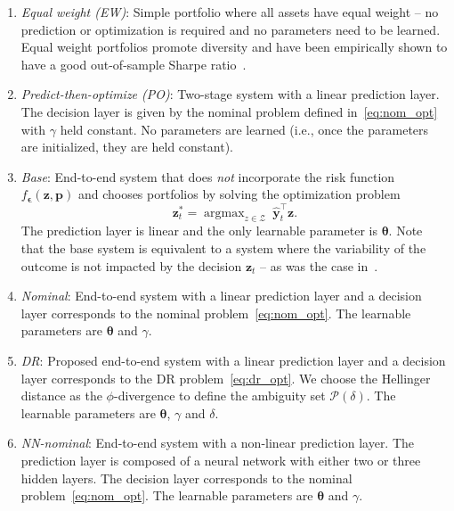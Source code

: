\documentclass[10pt, twocolumn]{article}
\theoremstyle{plain}
\theoremstyle{definition}
\DeclareMathOperator*{\argmax}{argmax}
\begin{document}
\begin{enumerate}[itemsep=-0.15em, topsep=0pt, leftmargin=*]
  
\item \emph{Equal weight (EW)}: Simple portfolio where all assets
  have equal weight -- no prediction or optimization is required
  and no parameters need to be learned. Equal weight portfolios 
  promote diversity and have been empirically shown to have a good 
  out-of-sample Sharpe ratio~\citep{demiguel2009optimal}.  
  
\item \emph{Predict-then-optimize (PO)}: Two-stage system with a linear
  prediction layer. The decision layer is given by the nominal problem defined 
  in~\eqref{eq:nom_opt} with \(\gamma\) held constant. No parameters are 
  learned (i.e., once the parameters are initialized, they are held constant).  
  
\item \emph{Base}: End-to-end system that does \emph{not} incorporate the
  risk function \(f_{\bm{\epsilon}}(\bm{z},\bm{p})\) and chooses
  portfolios by solving the optimization problem
  \[
    \bm{z}_{t}^* = \argmax_{z\in\mathcal{Z}}\ \hat{\bm{y}}_{t}^\top \bm{z}. 
  \]
  The prediction layer is linear and the only learnable parameter is
  \(\bm{\theta}\). Note that the base system is equivalent to a system where 
  the variability of the outcome is not impacted by the decision \(\bm{z}_t\) 
  -- as was the case in~\citet{donti2017task}.
  
\item \emph{Nominal}: End-to-end system with a linear prediction layer and
  a decision layer corresponds to the nominal problem~\eqref{eq:nom_opt}. The
  learnable parameters are \(\bm{\theta}\) and \(\gamma\).
  
\item \emph{DR}: Proposed end-to-end system with a linear prediction layer 
  and a decision layer corresponds to the DR problem~\eqref{eq:dr_opt}. We 
  choose the Hellinger distance as the \(\phi\)-divergence to define the 
  ambiguity set \(\mathcal{P}(\delta)\). The learnable parameters are 
  \(\bm{\theta}\), \(\gamma\) and \(\delta\).  

\item \emph{NN-nominal}: End-to-end system with a non-linear prediction 
  layer. The prediction layer is composed of a neural network with either 
  two or three hidden layers. The decision layer corresponds to the nominal
  problem~\eqref{eq:nom_opt}. The learnable parameters are \(\bm{\theta}\) 
  and \(\gamma\).


\end{enumerate}
\end{document}
